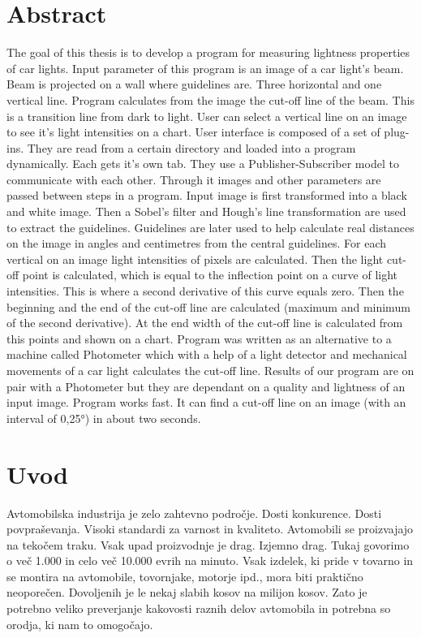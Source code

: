 \documentclass[oneside, a4paper, 12pt]{book}
\newcommand{\clearemptydoublepage}{\newpage{\pagestyle{empty}\cleardoublepage}}
\begin{document}
\chapter*{Abstract}

The goal of this thesis is to develop a program for measuring lightness properties of car lights. Input parameter of this program is an image of a car light's beam. Beam is projected on a wall where guidelines are. Three horizontal and one vertical line. Program calculates from the image the cut-off line of the beam. This is a transition line from dark to light. User can select a vertical line on an image to see it's light intensities on a chart. User interface is composed of a set of plug-ins. They are read from a certain directory and loaded into a program dynamically. Each gets it's own tab. They use a Publisher-Subscriber model to communicate with each other. Through it images and other parameters are passed between steps in a program. Input image is first transformed into a black and white image. Then a Sobel's filter and Hough's line transformation are used to extract the guidelines. Guidelines are later used to help calculate real distances on the image in angles and centimetres from the central guidelines. For each vertical on an image light intensities of pixels are calculated. Then the light cut-off point is calculated, which is equal to the inflection point on a curve of light intensities. This is where a second derivative of this curve equals zero. Then the beginning and the end of the cut-off line are calculated (maximum and minimum of the second derivative). At the end width of the cut-off line is calculated from this points and shown on a chart. Program was written as an alternative to a machine called Photometer which with a help of a light detector and mechanical movements of a car light calculates the cut-off line. Results of our program are on pair with a Photometer but they are dependant on a quality and lightness of an input image. Program works fast. It can find a cut-off line on an image (with an interval of 0,25°) in about two seconds.

\clearemptydoublepage

\mainmatter
\setcounter{page}{1}
\pagestyle{fancy}

\chapter{Uvod}
Avtomobilska industrija je zelo zahtevno področje. Dosti konkurence. Dosti povpraševanja. Visoki standardi za varnost in kvaliteto. Avtomobili se proizvajajo na tekočem traku. Vsak upad proizvodnje je drag. Izjemno drag. Tukaj govorimo o več 1.000 in celo več 10.000 evrih na minuto. Vsak izdelek, ki pride v tovarno in se montira na avtomobile, tovornjake, motorje ipd., mora biti praktično neoporečen. Dovoljenih je le nekaj slabih kosov na milijon kosov. Zato je potrebno veliko preverjanje kakovosti raznih delov avtomobila in potrebna so orodja, ki nam to omogočajo.
\end{document}
